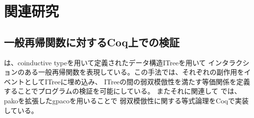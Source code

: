 \documentclass[japanese]{jssst_ppl}
\theoremstyle{definition}
\begin{document}
  \iffalse
    \begin{verbatim}
  |《 rewrite under cnew mlint 1 >>= by bindfwB》|
  factdts_aux n a >> (cget a >>= [eta Ret])
  |《 fixpointE 》|
  cget a >>=
  (fun x : coq_type N ml_int => (cput a (fact n * x) >> Ret tt) >> (cget a >>= [eta Ret]))
  |《 rewrite under cget a >>= by eqbind》|
  (cput a (fact n * x) >> Ret tt) >> (cget a >>= [eta Ret])
  |《 fixpointE 》|
  cput a (fact n * x) >> (cget a >>= [eta Ret])
  |《 over 》|
  cnew ml_int 1 >>=
  (fun a : loc ml_int =>
   cget a >>=
   (fun x : coq_type N ml_int => cput a (fact n * x) >> (cget a >>= [eta Ret])))
   |《 fixpointE 》|
   cnew ml_int (fact n) >>= (fun r : loc ml_int => cget r >>= [eta Ret])

\end{verbatim}
  \fi

  \iffalse
    |《 rewrite under cnew ml_int 1 >>= by bindfwB》|
    factdts_aux n a >> (cget a >>= [eta Ret])
    |《 fixpointE 》|
    cget a >>=
    (fun x : coq_type N ml_int => (cput a (fact n * x) >> Ret tt) >> (cget a >>= [eta Ret]))
    |《 rewrite under cget a >>= by eq_bind》|
    (cput a (fact n * x) >> Ret tt) >> (cget a >>= [eta Ret])
    |《 fixpointE 》|
    cput a (fact n * x) >> (cget a >>= [eta Ret])
    |《 over 》|
    cnew ml_int 1 >>=
    (fun a : loc ml_int =>
    cget a >>=
    (fun x : coq_type N ml_int => cput a (fact n * x) >> (cget a >>= [eta Ret])))
    |《 fixpointE 》|
    cnew ml_int (fact n) >>= (fun r : loc ml_int => cget r >>= [eta Ret])

  \fi
\fi

\section{関連研究}
\subsection{一般再帰関数に対するCoq上での検証}
\cite{ddd}は、coinductive typeを用いて定義されたデータ構造ITreeを用いて
インタラクションのある一般再帰関数を表現している。この手法では、それぞれの副作用をイベントとしてITreeに埋め込み、
ITreeの間の弱双模倣性を満たす等価関係を定義することでプログラムの検証を可能にしている。
またそれに関連して
\cite{ddd}では、pakoを拡張したgpacoを用いることで
弱双模倣性に関する等式論理をCoqで実装している。

\end{document}
